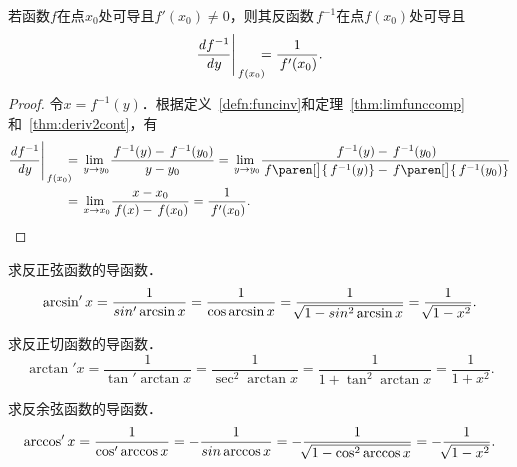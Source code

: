 \begin{theorem}
  \label{thm:derivinv}
  若函数\(f\)在点\(x_0\)处可导且\(f'(x_0) \ne 0\)，则其反函数\(\,f^{-1}\)在点\(f(x_0)\)处可导且
  \begin{equation*}
    \dd[f^{-1}]y \Bigg\vert_{\,f(x_0)} \mkern-11mu = \frac1{\,f'(x_0)}.
  \end{equation*}

  \begin{proof}
    令\(x = f^{-1}(y)\)．根据定义~\ref{defn:funcinv}和定理~\ref{thm:limfunccomp}和~\ref{thm:deriv2cont}，有
    \begin{equation*}
      \begin{split}
        \dd[f^{-1}]y \Bigg\vert_{\,f(x_0)} \mkern-11mu
        &= \lim_{\,y\to y_0\!} \frac{\,f^{-1}(y) - \,f^{-1}(y_0)}{y - y_0}
        = \lim_{\,y\to y_0\!} \frac{\,f^{-1}(y) - \,f^{-1}(y_0)}{\,f\paren[\big]{\,f^{-1}(y)} - \,f\paren[\big]{\,f^{-1}(y_0)}} \\
        &= \lim_{\,x\to x_0\!} \frac{x - x_0}{\,f(x) - \,f(x_0)}
        = \frac{1}{\,f'(x_0)}.
        \qedhere
      \end{split}
    \end{equation*}
  \end{proof}
\end{theorem}

\begin{example*}
  求反正弦函数的导函数．
  \begin{equation*}
    \arcsin'x
    = \frac1{\sin'\arcsin x}
    = \frac1{\cos\arcsin x}
    = \frac1{\negthickspace\sqrt{1 - \sin^2\arcsin x}}
    = \frac1{\negthickspace\sqrt{1 - x^2}}.
  \end{equation*}
\end{example*}

\begin{example*}
  求反正切函数的导函数．
  \begin{equation*}
    \arctan'x
    = \frac1{\tan'\arctan x}
    = \frac1{\sec^2\arctan x}
    = \frac1{1 + \tan^2\arctan x}
    = \frac1{1 + x^2}.
  \end{equation*}
\end{example*}

\begin{example*}
  求反余弦函数的导函数．
  \begin{equation*}
    \arccos'x
    = \frac1{\cos'\arccos x}
    = - \frac1{\sin\arccos x}
    = - \frac1{\negthickspace\sqrt{1 - \cos^2\arccos x}}
    = - \frac1{\negthickspace\sqrt{1 - x^2}}.
  \end{equation*}
\end{example*}

